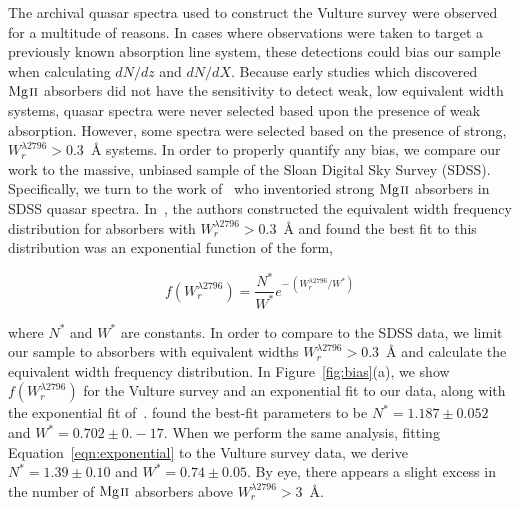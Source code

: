 \documentclass[iop,apj,numberedappendix,appendixfloats,twocolappendix]{emulateapj}
\begin{document}
\begin{figure*}[bth]
\caption{(a) The $W_r^{\lambda2796} \ge 0.3$~{\AA} equivalent width frequency distribution for the Vulture survey in black compared to the exponential fit of~\cite{Nestor2005}, shown as the orange dashed line, and an exponential fit to the Vulture survey data in purple. The exponential fits are of the form shown in Equation~\ref{eqn:exponential}. (b) The cumulative distribution of the survey data and two comparative exponential fits. The P(K-S) value shown compares our survey's data to the fit from~\cite{Nestor2005}. }
\label{fig:bias}
\end{figure*}

The archival quasar spectra used to construct the Vulture survey were observed for a multitude of reasons. In cases where observations were taken to target a previously known absorption line system, these detections could bias our sample when calculating $dN\!/dz$ and $dN\!/dX$. Because early studies which discovered ${\hbox{{\rm Mg}\kern 0.1em{\sc ii}}}$ absorbers did not have the sensitivity to detect weak, low equivalent width systems, quasar spectra were never selected based upon the presence of weak absorption. However, some spectra were selected based on the presence of strong, $W_r^{\lambda2796} > 0.3$~{\AA} systems. In order to properly quantify any bias, we compare our work to the massive, unbiased sample of the Sloan Digital Sky Survey (SDSS). Specifically, we turn to the work of~\cite{Nestor2005} who inventoried strong ${\hbox{{\rm Mg}\kern 0.1em{\sc ii}}}$ absorbers in SDSS quasar spectra. In~\cite{Nestor2005}, the authors constructed the equivalent width frequency distribution for absorbers with $W_r^{\lambda2796} > 0.3$~{\AA} and found the best fit to this distribution was an exponential function of the form,

\begin{equation}
f(W_r^{\lambda2796}) = \frac{N^*}{W^*} e^{-\,\left(W_r^{\lambda2796} / W^*\right)}
\label{eqn:exponential}
\end{equation}

\noindent where $N^*$ and $W^*$ are constants. In order to compare to the SDSS data, we limit our sample to absorbers with equivalent widths $W_r^{\lambda2796} > 0.3$~{\AA} and calculate the equivalent width frequency distribution. In Figure~\ref{fig:bias}(a), we show $f(W_r^{\lambda2796})$ for the Vulture survey and an exponential fit to our data, along with the exponential fit of~\cite{Nestor2005}. \cite{Nestor2005} found the best-fit parameters to be $N^* = 1.187 \pm 0.052$ and $W^* = 0.702 \pm 0.-17$. When we perform the same analysis, fitting Equation~\ref{eqn:exponential} to the Vulture survey data, we derive $N^* = 1.39 \pm 0.10$ and $W^* = 0.74 \pm 0.05$. By eye, there appears a slight excess in the number of ${\hbox{{\rm Mg}\kern 0.1em{\sc ii}}}$ absorbers above $W_r^{\lambda2796} > 3$~{\AA}.
\end{document}
